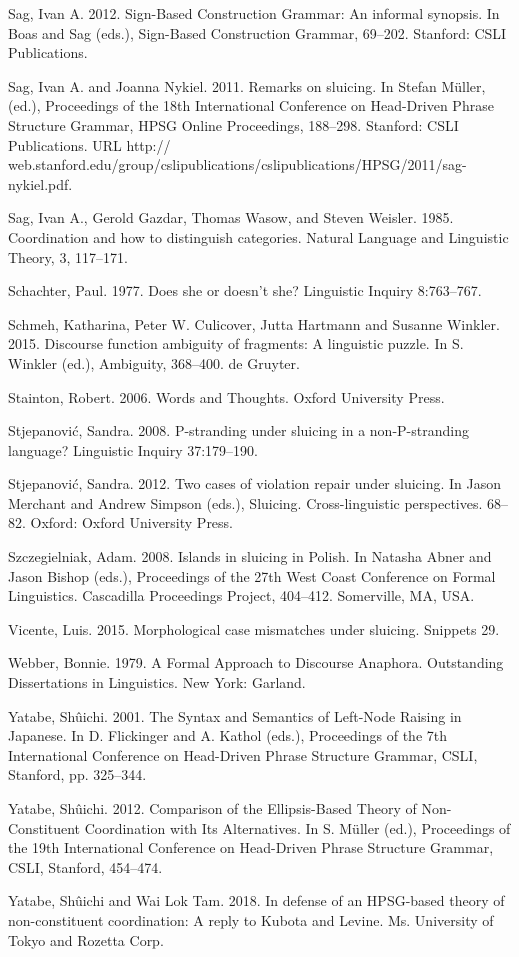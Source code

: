 \documentclass[output=paper
                ,modfonts
                ,nonflat
	        ,collection
	        ,collectionchapter
	        ,collectiontoclongg
 	        ,biblatex
                ,babelshorthands
                ,newtxmath
                ,draftmode
                ,colorlinks, citecolor=brown
]{./langsci/langscibook}
\begin{document}
\begin{description}
\item Sag, Ivan A. 2012. Sign-Based Construction Grammar: An informal synopsis. In Boas and Sag (eds.), Sign-Based Construction Grammar, 69--202. Stanford: CSLI Publications.
\item Sag, Ivan A. and Joanna Nykiel. 2011. Remarks on sluicing. In Stefan M\"{u}ller, (ed.),
Proceedings of the 18th International Conference on Head-Driven Phrase Structure
Grammar, HPSG Online Proceedings, 188--298. Stanford: CSLI Publications. URL http://
web.stanford.edu/group/cslipublications/cslipublications/HPSG/2011/sag-nykiel.pdf.
\item Sag, Ivan A., Gerold Gazdar, Thomas Wasow, and Steven Weisler. 1985. Coordination and how to distinguish categories.
Natural Language and Linguistic Theory, 3, 117--171.
\item Schachter, Paul. 1977. Does she or doesn't she? Linguistic Inquiry 8:763--767.
\item Schmeh, Katharina, Peter W. Culicover, Jutta Hartmann and Susanne Winkler. 2015. Discourse function ambiguity of fragments: A linguistic puzzle. In S. Winkler (ed.), Ambiguity, 368--400. de Gruyter.
\item Stainton, Robert. 2006. Words and Thoughts. Oxford University Press.
\item Stjepanovi\'{c}, Sandra. 2008. P-stranding under sluicing in a non-P-stranding language? Linguistic Inquiry 37:179--190.
\item Stjepanovi\'{c}, Sandra. 2012. Two cases of violation repair under sluicing. In Jason Merchant and Andrew Simpson (eds.), Sluicing. Cross-linguistic perspectives. 68--82. Oxford: Oxford University Press.
\item Szczegielniak, Adam. 2008. Islands in sluicing in Polish. In Natasha Abner and Jason Bishop (eds.), Proceedings of the 27th West Coast Conference on Formal Linguistics. Cascadilla Proceedings Project, 404--412. Somerville, MA, USA.
\item Vicente, Luis. 2015. Morphological case mismatches under sluicing. Snippets 29.
\item Webber, Bonnie. 1979. A Formal Approach to Discourse Anaphora. Outstanding
Dissertations in Linguistics. New York: Garland.
\item Yatabe, Sh\^{u}ichi. 2001. The Syntax and Semantics of Left-Node Raising in Japanese. In
D. Flickinger and A. Kathol (eds.), Proceedings of the 7th International Conference
on Head-Driven Phrase Structure Grammar, CSLI, Stanford, pp. 325--344.
\item Yatabe, Sh\^{u}ichi. 2012. Comparison of the Ellipsis-Based Theory of Non-Constituent Coordination with Its Alternatives. In S. M\"{u}ller (ed.), Proceedings of the 19th International
Conference on Head-Driven Phrase Structure Grammar, CSLI, Stanford, 454--474.
\item  Yatabe, Sh\^{u}ichi and Wai Lok Tam. 2018. In defense of an HPSG-based theory of
non-constituent coordination: A reply to Kubota and Levine. Ms. University of Tokyo and Rozetta Corp.
\end{description}

 
\printbibliography[heading=subbibliography,notkeyword=this] 
\end{document}
